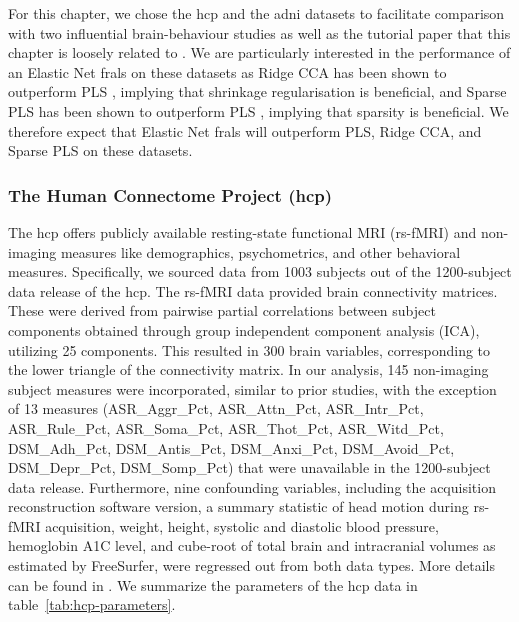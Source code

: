 For this chapter, we chose the \acrshort{hcp} and the \acrshort{adni} datasets to facilitate comparison with two influential brain-behaviour studies \citep{smith2015positive, monteiro2016multiple} as well as the tutorial paper that this chapter is loosely related to \citep{mihalik2022canonical}.
We are particularly interested in the performance of an Elastic Net \acrshort{frals}  on these datasets as Ridge CCA has been shown to outperform PLS \citep{mihalik2022canonical}, implying that shrinkage regularisation is beneficial, and Sparse PLS has been shown to outperform PLS \citep{monteiro2016multiple}, implying that sparsity is beneficial.
We therefore expect that Elastic Net \acrshort{frals} will outperform PLS, Ridge CCA, and Sparse PLS on these datasets.

\subsubsection{The Human Connectome Project (\acrshort{hcp})}

The \acrshort{hcp} offers publicly available resting-state functional MRI (rs-fMRI) and non-imaging measures like demographics, psychometrics, and other behavioral measures.
Specifically, we sourced data from 1003 subjects out of the 1200-subject data release of the \acrshort{hcp}.
The rs-fMRI data provided brain connectivity matrices. These were derived from pairwise partial correlations between subject components obtained through group independent component analysis (ICA), utilizing 25 components. This resulted in 300 brain variables, corresponding to the lower triangle of the connectivity matrix. In our analysis, 145 non-imaging subject measures were incorporated, similar to prior studies, with the exception of 13 measures (ASR\_Aggr\_Pct, ASR\_Attn\_Pct, ASR\_Intr\_Pct, ASR\_Rule\_Pct, ASR\_Soma\_Pct, ASR\_Thot\_Pct, ASR\_Witd\_Pct, DSM\_Adh\_Pct, DSM\_Antis\_Pct, DSM\_Anxi\_Pct, DSM\_Avoid\_Pct, DSM\_Depr\_Pct, DSM\_Somp\_Pct) that were unavailable in the 1200-subject data release. Furthermore, nine confounding variables, including the acquisition reconstruction software version, a summary statistic of head motion during rs-fMRI acquisition, weight, height, systolic and diastolic blood pressure, hemoglobin A1C level, and cube-root of total brain and intracranial volumes as estimated by FreeSurfer, were regressed out from both data types.
More details can be found in \citet{smith2015positive, mihalik2022canonical}.
We summarize the parameters of the \acrshort{hcp} data in table~\ref{tab:hcp-parameters}.

